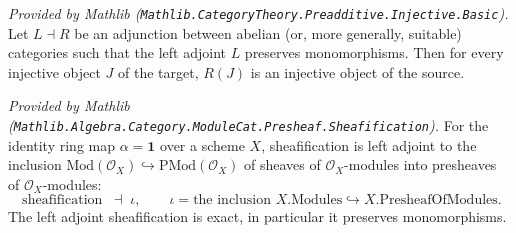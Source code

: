 \begin{lemma}
  \label{lem:injective_of_adjoint}
  \mathlibok
  \textit{Provided by Mathlib
  (\texttt{Mathlib.CategoryTheory.Preadditive.Injective.Basic}).}
  Let \(L \dashv R\) be an adjunction between abelian (or, more generally, suitable)
  categories such that the left adjoint \(L\) preserves monomorphisms. Then for every
  injective object \(J\) of the target, \(R(J)\) is an injective object of the source.
\end{lemma}

\begin{lemma}
  \label{lem:mod_pmod_adjunction}
  \mathlibok
  \textit{Provided by Mathlib
  (\texttt{Mathlib.Algebra.Category.ModuleCat.Presheaf.Sheafification}).}
  For the identity ring map \(\alpha = \mathbf{1}\) over a scheme \(X\),
  sheafification is left adjoint to the inclusion
  \(\mathrm{Mod}(\mathcal{O}_X) \hookrightarrow \mathrm{PMod}(\mathcal{O}_X)\) of
  sheaves of \(\mathcal{O}_X\)-modules into presheaves of \(\mathcal{O}_X\)-modules:
  \[
    \operatorname{sheafification} \;\dashv\; \iota,
    \qquad
    \iota = \text{the inclusion } X.\mathrm{Modules} \hookrightarrow
    X.\mathrm{PresheafOfModules}.
  \]
  The left adjoint sheafification is exact, in particular it preserves
  monomorphisms.
\end{lemma}

